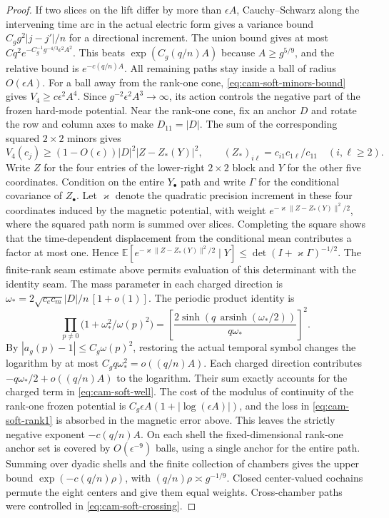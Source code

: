 \documentclass[11pt,a4paper]{article}
\numberwithin{equation}{section}
\begin{document}
\begin{proof}
If two slices on the lift differ by more than \(\epsilon A\), Cauchy--Schwarz along the intervening time arc in the actual electric form gives a variance bound \(C_gg^2|j-j'|/n\) for a directional increment. The union bound gives at most \(Cq^2 e^{-C_g^{-1}g^{-4/3}\epsilon^2 A^2}\). This beats \(\exp(C_g(q/n)A)\) because \(A\ge g^{5/9}\), and the relative bound is \(e^{-c(q/n)A}\). All remaining paths stay inside a ball of radius \(O(\epsilon A)\). For a ball away from the rank-one cone, \eqref{eq:cam-soft-minors-bound} gives \(V_4\ge c\epsilon^2 A^4\). Since \(g^{-2}\epsilon^2A^3\to\infty\), its action controls the negative part of the frozen hard-mode potential. Near the rank-one cone, fix an anchor \(D\) and rotate the row and column axes to make \(D_{11}=|D|\). The sum of the corresponding squared \(2\times2\) minors gives
\[
 V_4(c_j)\ge(1-O(\epsilon))|D|^2 |Z-Z_*(Y)|^2,\qquad
 (Z_*)_{i\ell}=c_{i1}c_{1\ell}/c_{11}\quad (i,\ell\ge2).
\]
Write \(Z\) for the four entries of the lower-right \(2\times2\) block and \(Y\) for the other five coordinates. Condition on the entire \(Y_\bullet\) path and write \(\Gamma\) for the conditional covariance of \(Z_\bullet\). Let \(\varkappa\) denote the quadratic precision increment in these four coordinates induced by the magnetic potential, with weight \(e^{-\varkappa\|Z-Z_*(Y)\|^2/2}\), where the squared path norm is summed over slices. Completing the square shows that the time-dependent displacement from the conditional mean contributes a factor at most one. Hence
\(\mathbb E[e^{-\varkappa\|Z-Z_*(Y)\|^2/2}\mid Y]\le\det(I+\varkappa\Gamma)^{-1/2}\).
The finite-rank seam estimate above permits evaluation of this determinant with the identity seam. The mass parameter in each charged direction is
\(\omega_*=2\sqrt{c_ec_m}|D|/n\,[1+o(1)]\).
The periodic product identity is
\[
 \prod_{p\ne0}\big(1+\omega_*^2/\omega(p)^2\big)
   =\left[\frac{2\sinh(q\,\operatorname{arsinh}(\omega_*/2))}
                {q\omega_*}\right]^2 .
\]
By \(|a_g(p)-1|\le C_g\omega(p)^2\), restoring the actual temporal symbol changes the logarithm by at most \(C_g q\omega_*^2=o((q/n)A)\). Each charged direction contributes \(-q\omega_*/2+o((q/n)A)\) to the logarithm. Their sum exactly accounts for the charged term in \eqref{eq:cam-soft-well}. The cost of the modulus of continuity of the rank-one frozen potential is
\(C_g\epsilon A(1+|\log(\epsilon A)|)\), and the loss in \eqref{eq:cam-soft-rank1} is absorbed in the magnetic error above. This leaves the strictly negative exponent \(-c(q/n)A\). On each shell the fixed-dimensional rank-one anchor set is covered by \(O(\epsilon^{-9})\) balls, using a single anchor for the entire path. Summing over dyadic shells and the finite collection of chambers gives the upper bound \(\exp(-c(q/n)\rho)\), with \((q/n)\rho\asymp g^{-1/9}\). Closed center-valued cochains permute the eight centers and give them equal weights. Cross-chamber paths were controlled in \eqref{eq:cam-soft-crossing}.
\end{proof}
\end{document}
